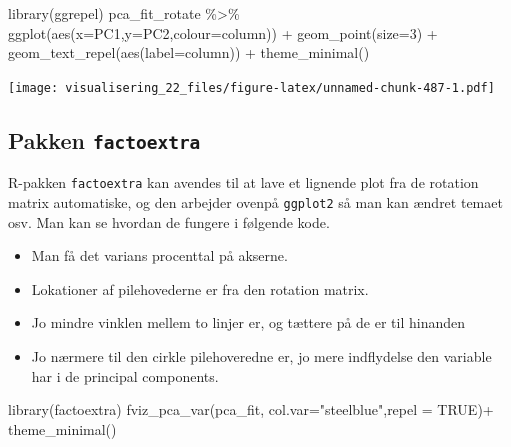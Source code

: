 \documentclass[
]{book}
\newenvironment{Shaded}{\begin{snugshade}}{\end{snugshade}}
\newcommand{\AttributeTok}[1]{\textcolor[rgb]{0.77,0.63,0.00}{#1}}
\newcommand{\ConstantTok}[1]{\textcolor[rgb]{0.00,0.00,0.00}{#1}}
\newcommand{\DecValTok}[1]{\textcolor[rgb]{0.00,0.00,0.81}{#1}}
\newcommand{\FunctionTok}[1]{\textcolor[rgb]{0.00,0.00,0.00}{#1}}
\newcommand{\NormalTok}[1]{#1}
\newcommand{\SpecialCharTok}[1]{\textcolor[rgb]{0.00,0.00,0.00}{#1}}
\newcommand{\StringTok}[1]{\textcolor[rgb]{0.31,0.60,0.02}{#1}}
\providecommand{\tightlist}{%
  \setlength{\itemsep}{0pt}\setlength{\parskip}{0pt}}
\begin{document}
\begin{Shaded}
\begin{Highlighting}[]
\FunctionTok{library}\NormalTok{(ggrepel)}
\NormalTok{pca\_fit\_rotate }\SpecialCharTok{\%\textgreater{}\%}
  \FunctionTok{ggplot}\NormalTok{(}\FunctionTok{aes}\NormalTok{(}\AttributeTok{x=}\NormalTok{PC1,}\AttributeTok{y=}\NormalTok{PC2,}\AttributeTok{colour=}\NormalTok{column)) }\SpecialCharTok{+} 
  \FunctionTok{geom\_point}\NormalTok{(}\AttributeTok{size=}\DecValTok{3}\NormalTok{) }\SpecialCharTok{+} 
  \FunctionTok{geom\_text\_repel}\NormalTok{(}\FunctionTok{aes}\NormalTok{(}\AttributeTok{label=}\NormalTok{column)) }\SpecialCharTok{+} 
  \FunctionTok{theme\_minimal}\NormalTok{()}
\end{Highlighting}
\end{Shaded}

\texttt{[image: visualisering\_22\_files/figure-latex/unnamed-chunk-487-1.pdf]}

\hypertarget{pakken-factoextra}{%
\subsection{\texorpdfstring{Pakken \texttt{factoextra}}{Pakken factoextra}}\label{pakken-factoextra}}

R-pakken \texttt{factoextra} kan avendes til at lave et lignende plot fra de rotation matrix automatiske, og den arbejder ovenpå \texttt{ggplot2} så man kan ændret temaet osv. Man kan se hvordan de fungere i følgende kode.

\begin{itemize}
\tightlist
\item
  Man få det varians procenttal på akserne.
\item
  Lokationer af pilehovederne er fra den rotation matrix.
\item
  Jo mindre vinklen mellem to linjer er, og tættere på de er til hinanden
\item
  Jo nærmere til den cirkle pilehoveredne er, jo mere indflydelse den variable har i de principal components.
\end{itemize}

\begin{Shaded}
\begin{Highlighting}[]
\FunctionTok{library}\NormalTok{(factoextra)}
\FunctionTok{fviz\_pca\_var}\NormalTok{(pca\_fit, }\AttributeTok{col.var=}\StringTok{"steelblue"}\NormalTok{,}\AttributeTok{repel =} \ConstantTok{TRUE}\NormalTok{)}\SpecialCharTok{+}
  \FunctionTok{theme\_minimal}\NormalTok{()}
\end{Highlighting}
\end{Shaded}
\end{document}
